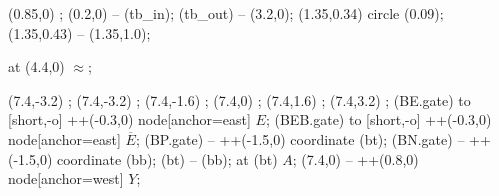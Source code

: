 \begin{circuitikz}
\begin{scope}[shift={(0,8.5)}]
  \end{scope}

  \begin{scope}[shift={(2.0,0)}]

    \draw (0.85,0) ;
    \draw (0.2,0) -- (tb_in);
    \draw (tb_out) -- (3.2,0);
    \draw (1.35,0.34) circle (0.09);
    \draw (1.35,0.43) -- (1.35,1.0);

    \node[armygreen, scale=1.4] at (4.4,0) {$\approx$};

    \draw (7.4,-3.2) \vground;
    \draw (7.4,-3.2) ;
    \draw (7.4,-1.6) ;
    \draw (7.4,0) ;
    \draw (7.4,1.6) ;
    \draw (7.4,3.2) \vsupply;
    \draw (BE.gate) to [short,-o] ++(-0.3,0) node[anchor=east] {$E$};
    \draw (BEB.gate) to [short,-o] ++(-0.3,0) node[anchor=east] {$\overline{E}$};
    \draw (BP.gate) -- ++(-1.5,0) coordinate (bt);
    \draw (BN.gate) -- ++(-1.5,0) coordinate (bb);
    \draw (bt) -- (bb);
    \node[anchor=south east] at (bt) {$A$};
    \draw (7.4,0) -- ++(0.8,0) node[anchor=west] {$Y$};

  \end{scope}

\end{circuitikz}

